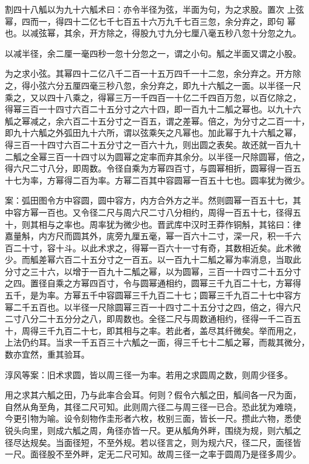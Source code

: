 \documentclass[a4paper,12pt,UTF8,twoside]{ctexbook}
\begin{document}
割四十八觚以为九十六觚术曰：亦令半径为弦，半面为句，为之求股。置次 上弦幂，四而一，得四十二亿七千七百五十六万九千七百三忽，余分弃之，即句 幂也。以减弦幂，其余，开方除之，得股九寸九分七厘八毫五秒八忽十分忽之九。

以减半径，余二厘一毫四秒一忽十分忽之一，谓之小句。觚之半面又谓之小股。

为之求小弦。其幂四十二亿八千二百一十五万四千一十二忽，余分弃之。开方除 之，得小弦六分五厘四毫三秒八忽，余分弃之，即九十六觚之一面。以半径一尺 乘之，又以四十八乘之，得幂三万一千四百一十亿二千四百万忽，以百亿除之， 得幂三百一十四寸六百二十五分寸之六十四，即一百九十二觚之幂也。以九十六 觚之幂减之，余六百二十五分寸之一百五，谓之差幂。倍之，为分寸之二百一十， 即九十六觚之外弧田九十六所，谓以弦乘矢之凡幂也。加此幂于九十六觚之幂， 得三百一十四寸六百二十五分寸之一百六十九，则出圆之表矣。故还就一百九十 二觚之全幂三百一十四寸以为圆幂之定率而弃其余分。以半径一尺除圆幂，倍之， 得六尺二寸八分，即周数。令径自乘为方幂四百寸，与圆幂相折，圆幂得一百五 十七为率，方幂得二百为率。方幂二百其中容圆幂一百五十七也。圆率犹为微少。

案：弧田图令方中容圆，圆中容方，内方合外方之半。然则圆幂一百五十七，其 中容方幂一百也。又令径二尺与周六尺二寸八分相约，周得一百五十七，径得五 十，则其相与之率也。周率犹为微少也。晋武库中汉时王莽作铜斛，其铭曰：律 嘉量斛，内方尺而圆其外，庣旁九厘五毫，幂一百六十二寸，深一尺，积一千六 百二十寸，容十斗。以此术求之，得幂一百六十一寸有奇，其数相近矣。此术微 少。而觚差幂六百二十五分寸之一百五。以一百九十二觚之幂为率消息，当取此 分寸之三十六，以增于一百九十二觚之幂，以为圆幂，三百一十四寸二十五分寸 之四。置径自乘之方幂四百寸，令与圆幂通相约，圆幂三千九百二十七，方幂得 五千，是为率。方幂五千中容圆幂三千九百二十七；圆幂三千九百二十七中容方 幂二千五百也。以半径一尺除圆幂三百一十四寸二十五分寸之四，倍之，得六尺 二寸八分二十五分分之八，即周数也。全径二尺与周数通相约，径得一千二百五 十，周得三千九百二十七，即其相与之率。若此者，盖尽其纤微矣。举而用之， 上法仍约耳。当求一千五百三十六觚之一面，得三千七十二觚之幂，而裁其微分， 数亦宜然，重其验耳。

淳风等案：旧术求圆，皆以周三径一为率。若用之求圆周之数，则周少径多。

用之求其六觚之田，乃与此率合会耳。何则？假令六觚之田，觚间各一尺为面， 自然从角至角，其径二尺可知。此则周六径二与周三径一已合。恐此犹为难晓， 今更引物为喻。设令刻物作圭形者六枚，枚别三面，皆长一尺。攒此六物，悉使 锐头向里，则成六觚之周，角径亦皆一尺。更从觚角外畔，围绕为规，则六觚之 径尽达规矣。当面径短，不至外规。若以径言之，则为规六尺，径二尺，面径皆 一尺。面径股不至外畔，定无二尺可知。故周三径一之率于圆周乃是径多周少。
\end{document}
